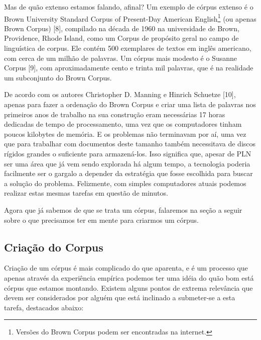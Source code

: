 \documentclass[11pt]{report}
\begin{document}
Mas de quão extenso estamos falando, afinal? Um exemplo de córpus extenso é o Brown University Standard Corpus of Present-Day American English\footnote[1]{
Versões do Brown Corpus podem ser encontradas na internet.} (ou apenas Brown Corpus) [8], compilado na década de 1960 na universidade de Brown, Providence, Rhode Island, como um Corpus de
propósito geral no campo de linguística de corpus. Ele contém 500 exemplares de textos em inglês americano, com cerca de um milhão de palavras. Um córpus mais modesto é o Susanne Corpus [9],
com aproximadamente cento e trinta mil palavras, que é na realidade um subconjunto do Brown Corpus.

De acordo com os autores Christopher D. Manning e Hinrich Schuetze [10], apenas para fazer a ordenação do Brown Corpus e criar uma lista de palavras nos primeiros anos de trabalho na
sua construção eram necessárias 17 horas dedicadas de tempo de processamento, uma vez que os computadores tinham poucos kilobytes de memória. E os problemas não terminavam por aí,
uma vez que para trabalhar com documentos deste tamanho também necessitava de discos rígidos grandes o suficiente para armazená-los. Isso significa que, apesar de PLN ser uma área
que já vem sendo explorada há algum tempo, a tecnologia poderia facilmente ser o gargalo a depender da estratégia que fosse escolhida para buscar a solução do problema. Felizmente,
com simples computadores atuais podemos realizar estas mesmas tarefas em questão de minutos.

Agora que já sabemos de que se trata um córpus, falaremos na seção a seguir sobre o que precisamos ter em mente para criarmos um córpus.

\subsection{Criação do Corpus}

\indent\indent Criação de um córpus é mais complicado do que aparenta, e é um processo que apenas através da experiência empírica podemos ter uma idéia do
quão bom está córpus que estamos montando. Existem alguns pontos de extrema relevância que devem ser considerados por alguém que está inclinado a submeter-se a esta
tarefa, destacados abaixo:
\end{document}
